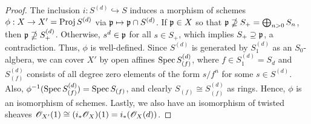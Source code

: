 \documentclass{article}
\begin{document}
\begin{enumerate} [label=\textbf{\arabic*.}, leftmargin=0em]
\begin{proof}
    The inclusion $i : S^{(d)} \hookrightarrow S$ induces a morphism of schemes $\phi : X \to X' = \operatorname{Proj}{S^{(d)}}$ via $\mathfrak{p} \mapsto \mathfrak{p} \cap S^{(d)}$. If $\mathfrak{p} \in X$ so that $\mathfrak{p} \nsupseteq S_+ = \bigoplus_{n > 0} S_n$, then $\mathfrak{p} \nsupseteq S_+^{(d)}$. Otherwise, $s^d \in \mathfrak{p}$ for all $s \in S_+$, which implies $S_+ \supseteq \mathfrak{p}$, a contradiction. Thus, $\phi$ is well-defined. Since $S^{(d)}$ is generated by $S^{(d)}_1$ as an $S_0$-algbera, we can cover $X'$ by open affines $\operatorname{Spec}{S^{(d)}_{(f)}}$, where $f \in S^{(d)}_1 = S_d$ and $S^{(d)}_{(f)}$ consists of all degree zero elements of the form $s / f^n$ for some $s \in S^{(d)}$. Also, $\phi^{-1}(\operatorname{Spec}{S^{(d)}_{(f)}}) = \operatorname{Spec}{S_{(f)}}$, and clearly $S_{(f)} \cong S_{(f)}^{(d)}$ as rings. Hence, $\phi$ is an isomorphism of schemes. Lastly, we also have an isomorphism of twisted sheaves $\mathscr{O}_{X'}(1) \cong (i_* \mathscr{O}_{X})(1) = i_*(\mathscr{O}_X(d))$.
\end{proof}


\end{enumerate}
\end{document}
